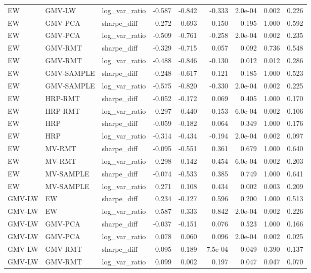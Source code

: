 \begin{table}[t]
{\begin{tabular}{lllrrrrrr}
EW & GMV-LW & log\_var\_ratio & -0.587 & -0.842 & -0.333 & 2.0e-04 & 0.002 & 0.226 \\
EW & GMV-PCA & sharpe\_diff & -0.272 & -0.693 & 0.150 & 0.195 & 1.000 & 0.592 \\
EW & GMV-PCA & log\_var\_ratio & -0.509 & -0.761 & -0.258 & 2.0e-04 & 0.002 & 0.235 \\
EW & GMV-RMT & sharpe\_diff & -0.329 & -0.715 & 0.057 & 0.092 & 0.736 & 0.548 \\
EW & GMV-RMT & log\_var\_ratio & -0.488 & -0.846 & -0.130 & 0.012 & 0.012 & 0.286 \\
EW & GMV-SAMPLE & sharpe\_diff & -0.248 & -0.617 & 0.121 & 0.185 & 1.000 & 0.523 \\
EW & GMV-SAMPLE & log\_var\_ratio & -0.575 & -0.820 & -0.330 & 2.0e-04 & 0.002 & 0.225 \\
EW & HRP-RMT & sharpe\_diff & -0.052 & -0.172 & 0.069 & 0.405 & 1.000 & 0.170 \\
EW & HRP-RMT & log\_var\_ratio & -0.297 & -0.440 & -0.153 & 6.0e-04 & 0.002 & 0.106 \\
EW & HRP & sharpe\_diff & -0.059 & -0.182 & 0.064 & 0.349 & 1.000 & 0.176 \\
EW & HRP & log\_var\_ratio & -0.314 & -0.434 & -0.194 & 2.0e-04 & 0.002 & 0.097 \\
EW & MV-RMT & sharpe\_diff & -0.095 & -0.551 & 0.361 & 0.679 & 1.000 & 0.640 \\
EW & MV-RMT & log\_var\_ratio & 0.298 & 0.142 & 0.454 & 6.0e-04 & 0.002 & 0.203 \\
EW & MV-SAMPLE & sharpe\_diff & -0.074 & -0.533 & 0.385 & 0.749 & 1.000 & 0.641 \\
EW & MV-SAMPLE & log\_var\_ratio & 0.271 & 0.108 & 0.434 & 0.002 & 0.003 & 0.209 \\
GMV-LW & EW & sharpe\_diff & 0.234 & -0.127 & 0.596 & 0.200 & 1.000 & 0.513 \\
GMV-LW & EW & log\_var\_ratio & 0.587 & 0.333 & 0.842 & 2.0e-04 & 0.002 & 0.226 \\
GMV-LW & GMV-PCA & sharpe\_diff & -0.037 & -0.151 & 0.076 & 0.523 & 1.000 & 0.166 \\
GMV-LW & GMV-PCA & log\_var\_ratio & 0.078 & 0.060 & 0.096 & 2.0e-04 & 0.002 & 0.025 \\
GMV-LW & GMV-RMT & sharpe\_diff & -0.095 & -0.189 & -7.5e-04 & 0.049 & 0.390 & 0.137 \\
GMV-LW & GMV-RMT & log\_var\_ratio & 0.099 & 0.002 & 0.197 & 0.047 & 0.047 & 0.070 \\

\end{tabular}}
\end{table}
